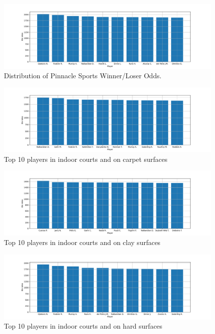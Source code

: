\documentclass[preprint,aps,nofootinbib,a4paper,superscriptaddress,longbibliography,amsfonts,amssymb,amsmath,titlepage]{revtex4-2}
\begin{document}
%
%
\begin{figure}[h]
\includegraphics[width=\textwidth]{pictures/top-10-elo-rates.pdf}
\caption{Distribution of Pinnacle Sports Winner/Loser Odds.}
\label{top-10-elo-rates}
\end{figure}
%
%
\begin{figure}[h]
\includegraphics[width=\textwidth]{pictures/top-10-elo-rates-indoor-carpet.pdf}
\caption{Top 10 players in indoor courts and on carpet surfaces}
\label{top-10-elo-rates-indoor-carpet}
\end{figure}
%
%
\begin{figure}[h]
\includegraphics[width=\textwidth]{pictures/top-10-elo-rates-indoor-clay.pdf}
\caption{Top 10 players in indoor courts and on clay surfaces}
\label{top-10-elo-rates-indoor-clay}
\end{figure}
%
%
\begin{figure}[h]
\includegraphics[width=\textwidth]{pictures/top-10-elo-rates-indoor-hard.pdf}
\caption{Top 10 players in indoor courts and on hard surfaces}
\label{top-10-elo-rates-indoor-hard}
\end{figure}
\end{document}
